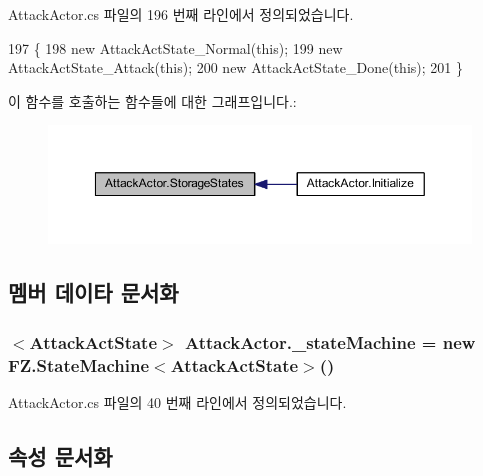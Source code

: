 Attack\+Actor.\+cs 파일의 196 번째 라인에서 정의되었습니다.


\begin{DoxyCode}
197     \{
198         \textcolor{keyword}{new} AttackActState\_Normal(\textcolor{keyword}{this});
199         \textcolor{keyword}{new} AttackActState\_Attack(\textcolor{keyword}{this});
200         \textcolor{keyword}{new} AttackActState\_Done(\textcolor{keyword}{this});
201     \}
\end{DoxyCode}


이 함수를 호출하는 함수들에 대한 그래프입니다.\+:\nopagebreak
\begin{figure}[H]
\begin{center}
\leavevmode
\includegraphics[width=350pt]{class_attack_actor_a4c1408e09de62ad12b42bee3251556ba_icgraph}
\end{center}
\end{figure}




\subsection{멤버 데이타 문서화}
\subsubsection[{\texorpdfstring{\+\_\+state\+Machine}{_stateMachine}}]{$<${\bf Attack\+Act\+State}$>$ Attack\+Actor.\+\_\+state\+Machine = new {\bf F\+Z.\+State\+Machine}$<${\bf Attack\+Act\+State}$>$()\hspace{0.3cm}{\ttfamily [private]}}\hypertarget{class_attack_actor_ae8b11071e5df53e1bda6649bd9075571}{}\label{class_attack_actor_ae8b11071e5df53e1bda6649bd9075571}


Attack\+Actor.\+cs 파일의 40 번째 라인에서 정의되었습니다.



\subsection{속성 문서화}
